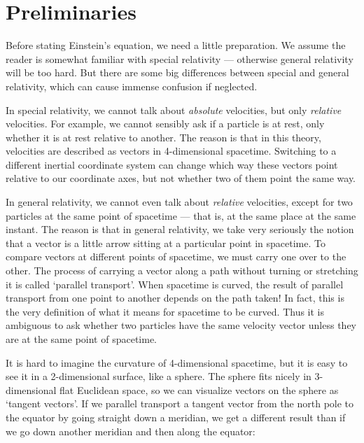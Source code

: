 \section{Preliminaries}
\label{sec:prelim}

Before stating Einstein's equation, we need a little preparation.  We
assume the reader is somewhat familiar with special relativity ---
otherwise general relativity will be too hard.  But there are some big
differences between special and general relativity, which can cause
immense confusion if neglected.  

In special relativity, we cannot talk about {\it absolute} velocities,
but only {\it relative} velocities.  For example, we cannot sensibly ask
if a particle is at rest, only whether it is at rest relative to
another.  The reason is that in this theory, velocities are described as
vectors in 4-dimensional spacetime.  Switching to a different inertial
coordinate system can change which way these vectors point
relative to our coordinate axes, but not
whether two of them point the same way.

In general relativity, we cannot even talk about {\it relative}
velocities, except for two particles at the same point of spacetime ---
that is, at the same place at the same instant.  The reason is that in
general relativity, we take very seriously the notion that a vector is a
little arrow sitting at a particular point in spacetime.  To compare
vectors at different points of spacetime, we must carry one over to the
other.  The process of carrying a vector along a path without turning or
stretching it is called `parallel transport'.  When spacetime is
curved, the result of parallel transport from one point to another
depends on the path taken!  In fact, this is the very definition of what
it means for spacetime to be curved.  Thus it is ambiguous to ask whether
two particles have the same velocity vector unless they are at the same
point of spacetime.

It is hard to imagine the curvature of 4-dimensional spacetime, but
it is easy to see it in a 2-dimensional surface, like a sphere.  The
sphere fits nicely in 3-dimensional flat Euclidean space, so
we can visualize vectors on the sphere as `tangent vectors'.
If we parallel transport a tangent vector from the north pole to the
equator by going straight down a meridian, we get a different result
than if we go down another meridian and then along the equator:

\medskip
\centerline{\epsfysize=2.0in} \medskip

